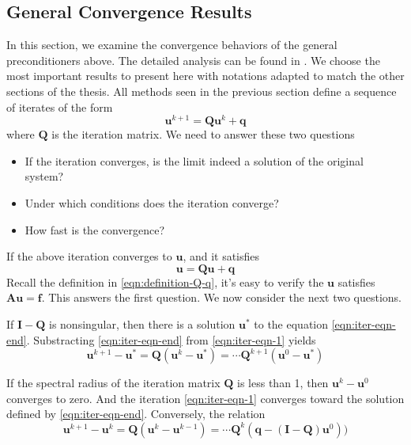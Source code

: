 \subsection{General Convergence Results}
\label{section:convergence-analysis}
In this section, we examine the convergence behaviors of the general preconditioners above. The detailed analysis can be found in \citep{doi:10.1137/1.9780898718003}. We choose the most important results to present here with notations adapted to match the other sections of the thesis.
All methods seen in the previous section define a sequence of iterates of the form
\begin{equation}
    \boldsymbol{u}^{k+1} = \boldsymbol{Q}\boldsymbol{u}^k + \boldsymbol{q}
    \label{eqn:iter-eqn-1}
\end{equation}
where $\boldsymbol{Q}$ is the iteration matrix. We need to answer these two questions
\begin{itemize}
    \item If the iteration converges, is the limit indeed a solution of the original system?
    \item Under which conditions does the iteration converge?
    \item How fast is the convergence?
\end{itemize}
If the above iteration converges to $\boldsymbol{u}$, and it satisfies
\begin{equation}
    \boldsymbol{u} = \boldsymbol{Q}\boldsymbol{u} + \boldsymbol{q}
    \label{eqn:iter-eqn-end}
\end{equation}
Recall the definition in \autoref{eqn:definition-Q-q}, it's easy to verify the $\boldsymbol{u}$ satisfies $\boldsymbol{A}\boldsymbol{u}= \boldsymbol{f}$. This answers the first question. We now consider the next two questions.

If $\boldsymbol{I} - \boldsymbol{Q}$ is nonsingular, then there is a solution $\boldsymbol{u}^*$ to the equation \autoref{eqn:iter-eqn-end}. Substracting \autoref{eqn:iter-eqn-end} from \autoref{eqn:iter-eqn-1} yields
\begin{equation}
    \boldsymbol{u}^{k+1} - \boldsymbol{u}^* = \boldsymbol{Q}(\boldsymbol{u}^k - \boldsymbol{u}^*) = \cdots \boldsymbol{Q}^{k+1}(\boldsymbol{u}^0 - \boldsymbol{u}^*)
\end{equation}



If the spectral radius of the iteration matrix $\boldsymbol{Q}$ is less than 1, then $\boldsymbol{u}^k - \boldsymbol{u}^0$ converges to zero. And the iteration \autoref{eqn:iter-eqn-1} converges toward the solution defined by \autoref{eqn:iter-eqn-end}. Conversely, the relation
\begin{equation}
    \boldsymbol{u}^{k+1} - \boldsymbol{u}^k = \boldsymbol{Q}(\boldsymbol{u}^{k} - \boldsymbol{u}^{k-1}) = \cdots \boldsymbol{Q}^{k} (\boldsymbol{q} - (\boldsymbol{I} - \boldsymbol{Q})\boldsymbol{u}^0))
\end{equation}

